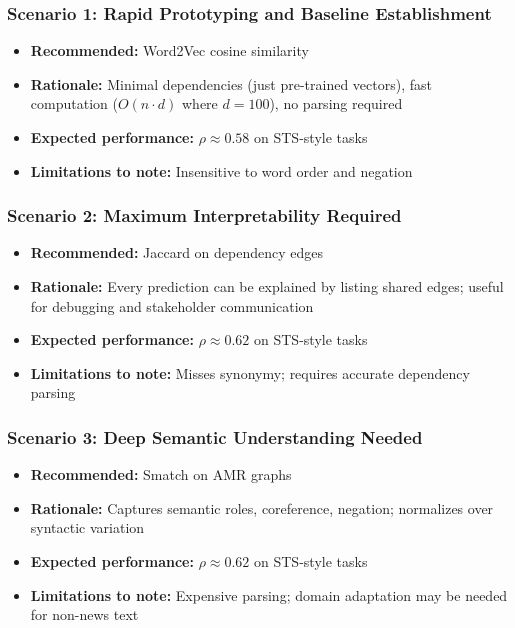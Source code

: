 \documentclass[11pt,a4paper]{article}
\begin{document}
\subsubsection{Scenario 1: Rapid Prototyping and Baseline Establishment}
\begin{itemize}
    \item \textbf{Recommended:} Word2Vec cosine similarity
    \item \textbf{Rationale:} Minimal dependencies (just pre-trained vectors), fast computation ($O(n \cdot d)$ where $d=100$), no parsing required
    \item \textbf{Expected performance:} $\rho \approx 0.58$ on STS-style tasks
    \item \textbf{Limitations to note:} Insensitive to word order and negation
\end{itemize}

\subsubsection{Scenario 2: Maximum Interpretability Required}
\begin{itemize}
    \item \textbf{Recommended:} Jaccard on dependency edges
    \item \textbf{Rationale:} Every prediction can be explained by listing shared edges; useful for debugging and stakeholder communication
    \item \textbf{Expected performance:} $\rho \approx 0.62$ on STS-style tasks
    \item \textbf{Limitations to note:} Misses synonymy; requires accurate dependency parsing
\end{itemize}

\subsubsection{Scenario 3: Deep Semantic Understanding Needed}
\begin{itemize}
    \item \textbf{Recommended:} Smatch on AMR graphs
    \item \textbf{Rationale:} Captures semantic roles, coreference, negation; normalizes over syntactic variation
    \item \textbf{Expected performance:} $\rho \approx 0.62$ on STS-style tasks
    \item \textbf{Limitations to note:} Expensive parsing; domain adaptation may be needed for non-news text
\end{itemize}
\end{document}
